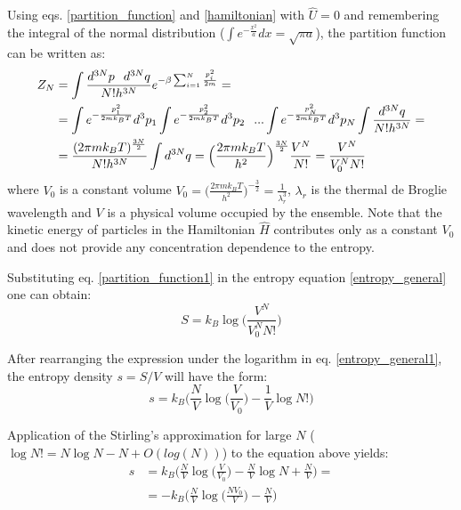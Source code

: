 Using eqs. \eqref{partition_function} and \eqref{hamiltonian} with $\hat{U}=0$ and remembering the integral of the normal distribution ($\int e^{-\frac{x^2}{a}} dx = \sqrt{\pi a}$), the partition function can be written as:
\begin{align}
 \label{partition_function1} Z_N&=\int \frac{d^{3N}p\hspace{0.1in}d^{3N}q}{N!h^{3N}}e^{-\beta \sum_{i=1}^N \frac{p_i^2}{2m}}= \nonumber \\
&= \int e^{-\frac{p_1^2}{2mk_BT}} d^3 p_1 \int e^{-\frac{p_2^2}{2mk_BT}} d^3 p_2 \hspace{0.1in} ... \int e^{-\frac{p_N^2}{2mk_BT}} d^3 p_N \int \frac{d^{3N}q}{N!h^{3N}} = \nonumber \\
&= \frac{(2\pi m k_B T)^{\frac{3N}{2}}}{N!h^{3N}} \int d^{3N}q = \Big(\frac{2\pi m k_B T}{h^2}\Big)^{\frac{3N}{2}}\frac{V^N}{N!} = \frac{V^N}{V_0^N N!}
\end{align}
where $V_0$ is a constant volume $V_0 = \Big(\frac{2\pi m k_B T}{h^2}\Big)^{-\frac{3}{2}} = \frac{1}{\lambda_r^3}$, $\lambda_r$ is the thermal de Broglie wavelength and $V$ is a physical volume occupied by the ensemble. Note that the kinetic energy of particles in the Hamiltonian $\hat{H}$ contributes only as a constant $V_0$ and does not provide any concentration dependence to the entropy.

Substituting eq. \eqref{partition_function1} in the entropy equation \eqref{entropy_general} one can obtain:
\begin{equation}
 \label{entropy_general1}S=k_B\log{\Big(\frac{V^N}{V_0^NN!}\Big)}
\end{equation}

After rearranging the expression under the logarithm in eq. \eqref{entropy_general1}, the entropy density $s=S/V$ will have the form:
\begin{equation}
 s=k_B\Big(\frac{N}{V}\log\Big({\frac{V}{V_0}}\Big) - \frac{1}{V}\log{N!}\Big)
\end{equation}

Application of the Stirling's approximation for large $N$ ($\log{N!} = N \log{N} - N + O(log(N))$) to the equation above yields:
\begin{align}
 s&=k_B\Big(\frac{N}{V}\log\Big({\frac{V}{V_0}}\Big) - \frac{N}{V}\log{N} + \frac{N}{V}\Big)= \nonumber \\
 \label{entropy0}&=-k_B\Big(\frac{N}{V}\log\Big({\frac{NV_0}{V}}\Big) - \frac{N}{V}\Big)
\end{align}

